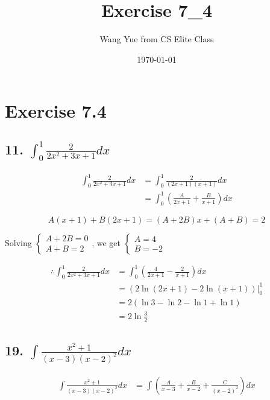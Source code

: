 \documentclass{article}
\begin{document}
    \title{Exercise 7\_4}
    \author{Wang Yue from CS Elite Class}
    \date{\today}
    \maketitle

    \section*{Exercise 7.4}

    \subsection*{11. $\int_0^1 \frac{2}{2x^2 + 3x + 1} dx$}

    $$\begin{aligned}
        \int_0^1 \frac{2}{2x^2 + 3x + 1} dx &= \int_0^1 \frac{2}{(2x + 1)(x + 1)} dx \\
        &= \int_0^1 (\frac{A}{2x + 1} + \frac{B}{x + 1}) dx
    \end{aligned}$$

    $$A(x + 1) + B(2x + 1) = (A + 2B) x + (A + B) = 2$$

    Solving $\left\{ \begin{array}{ll}
        A + 2B = 0 \\
        A + B = 2
    \end{array} \right.$, we get $\left\{ \begin{array}{ll}
        A = 4 \\
        B = -2
    \end{array} \right.$

    $$\begin{aligned}
        \therefore \int_0^1 \frac{2}{2x^2 + 3x + 1} dx &= \int_0^1 (\frac{4}{2x + 1} - \frac{2}{x + 1}) dx \\
        &= (2\ln (2x + 1) - 2 \ln(x + 1)) \biggl|_0^1 \\
        &= 2(\ln 3 - \ln 2 - \ln 1 + \ln 1) \\
        &= 2\ln \frac 3 2
    \end{aligned}$$

    \subsection*{19. $\int \frac{x^2 + 1}{(x - 3)(x - 2)^2} dx$}

    $$\begin{aligned}
        \int \frac{x^2 + 1}{(x - 3)(x - 2)^2} dx &= \int (\frac{A}{x - 3} + \frac{B}{x - 2} + \frac{C}{(x - 2)^2}) dx \\
    \end{aligned}$$
\end{document}
